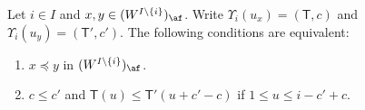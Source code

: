 \begin{theo} \label{thm:tab-cri}
Let 
$i \in I$ 
and 
$x,y \in (W^{I \setminus \{ i \}})_{\af}$. 
Write 
$\Upsilon_i(u_x) = (\mathsf{T},c)$
and 
$\Upsilon_i(u_y) = (\mathsf{T}',c')$. 
The following conditions are equivalent:
\begin{enumerate}[label=(\arabic*)]
\item\label{Theo4.7_1}
$x \preceq y$ 
in 
$(W^{I \setminus \{ i \}})_{\af}$. 
\item\label{Theo4.7_2}
$c \leq c'$ 
and 
$\mathsf{T}(u) \leq \mathsf{T}'(u + c' - c)$ 
if 
$1 \leq u \leq i - c' + c$. 
\end{enumerate}
\end{theo}